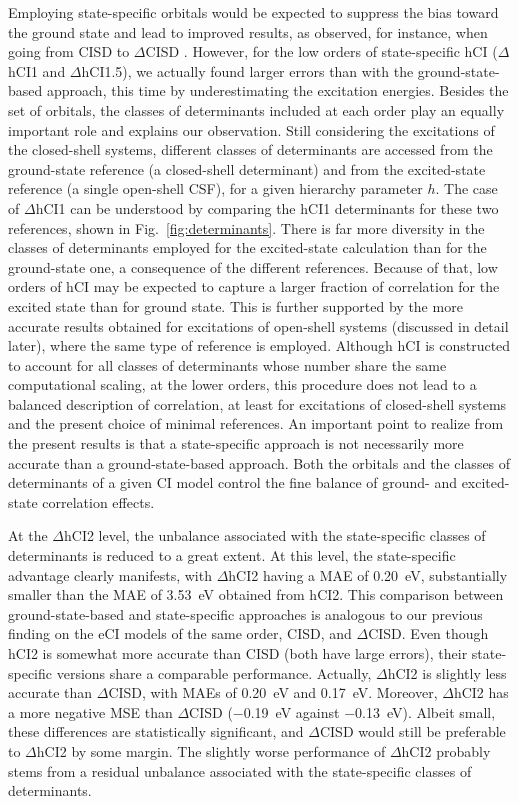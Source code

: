 \documentclass[aip,jcp,reprint,noshowkeys,superscriptaddress]{revtex4-1}
\begin{document}
Employing state-specific orbitals would be expected to suppress the bias toward the ground state and lead to improved results, as observed, for instance, when going from CISD to $\Delta$CISD \cite{Kossoski_2023}.
However, for the low orders of state-specific hCI ($\Delta$hCI1 and $\Delta$hCI1.5), we actually found larger errors than with the ground-state-based approach, this time by underestimating the excitation energies.
Besides the set of orbitals, the classes of determinants included at each order play an equally important role and explains our observation.
Still considering the excitations of the closed-shell systems,
different classes of determinants are accessed from the ground-state reference (a closed-shell determinant) and from the excited-state reference (a single open-shell CSF),
for a given hierarchy parameter $h$.
The case of $\Delta$hCI1 can be understood by comparing the hCI1 determinants for these two references, shown in Fig.~\ref{fig:determinants}.
There is far more diversity in the classes of determinants employed for the excited-state calculation than for the ground-state one, a consequence of the different references.
Because of that, low orders of hCI may be expected to capture a larger fraction of correlation for the excited state than for ground state.
This is further supported by the more accurate results obtained for excitations of open-shell systems (discussed in detail later), where the same type of reference is employed.
Although hCI is constructed to account for all classes of determinants whose number share the same computational scaling,
at the lower orders, this procedure does not lead to a balanced description of correlation, at least for excitations of closed-shell systems and the present choice of minimal references.
An important point to realize from the present results is that a state-specific approach is not necessarily more accurate than a ground-state-based approach.
Both the orbitals and the classes of determinants of a given CI model control the fine balance of ground- and excited-state correlation effects.

At the $\Delta$hCI2 level, the unbalance associated with the state-specific classes of determinants is reduced to a great extent.
At this level, the state-specific advantage clearly manifests, with $\Delta$hCI2 having a MAE of \SI{0.20}{\eV}, substantially smaller than the MAE of \SI{3.53}{\eV} obtained from hCI2.
This comparison between ground-state-based and state-specific approaches is analogous to our previous finding on the eCI models of the same order, CISD, and $\Delta$CISD. \cite{Kossoski_2023}
Even though hCI2 is somewhat more accurate than CISD (both have large errors), their state-specific versions share a comparable performance.
Actually, $\Delta$hCI2 is slightly less accurate than $\Delta$CISD, with MAEs of \SI{0.20}{\eV} and \SI{0.17}{\eV}.
Moreover, $\Delta$hCI2 has a more negative MSE than $\Delta$CISD (\SI{-0.19}{\eV} against \SI{-0.13}{\eV}).
Albeit small, these differences are statistically significant, and $\Delta$CISD would still be preferable to $\Delta$hCI2 by some margin.
The slightly worse performance of $\Delta$hCI2 probably stems from a residual unbalance associated with the state-specific classes of determinants.
\end{document}
